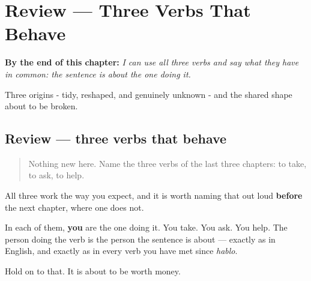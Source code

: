 
\chapter{Review --- Three Verbs That Behave}
\label{ch:spanish-review-ordinary-verbs}

\begin{chapteropening}
\textbf{By the end of this chapter:} \emph{I can use all three verbs and say what they have in common: the sentence is about the one doing it.}

Three origins - tidy, reshaped, and genuinely unknown - and the shared shape about to be broken.
\end{chapteropening}

\section[Practice]{Review — three verbs that behave}

\label{lesson:ES-C35-repaso-tres}



\begin{quote}
Nothing new here. Name the three verbs of the last three chapters: to take, to ask, to help.
\end{quote}

\begin{grammarlens}[title={What you've built}]
All three work the way you expect, and it is worth naming that out loud \textbf{before} the next chapter, where one does not.

In each of them, \textbf{you} are the one doing it. You take. You ask. You help. The person doing the verb is the person the sentence is about — exactly as in English, and exactly as in every verb you have met since \emph{hablo}.

Hold on to that. It is about to be worth money.
\end{grammarlens}

